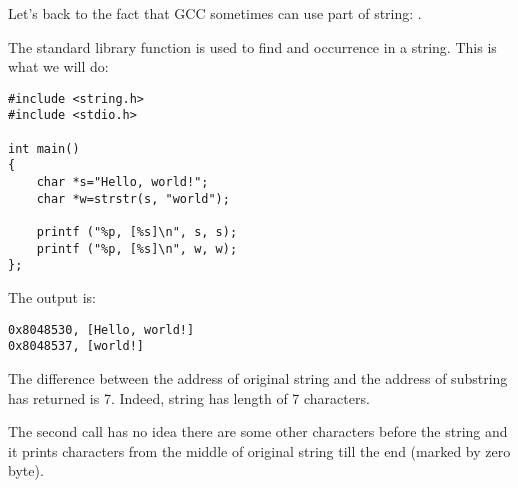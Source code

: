 \label{strstr_example}

Let's back to the fact that GCC sometimes can use part of string: .

The  \CCpp standard library function is used to find and occurrence in a string.
This is what we will do:

\begin{lstlisting}
#include <string.h>
#include <stdio.h>

int main()
{
	char *s="Hello, world!";
	char *w=strstr(s, "world");

	printf ("%p, [%s]\n", s, s);
	printf ("%p, [%s]\n", w, w);
};
\end{lstlisting}

The output is:

\begin{lstlisting}
0x8048530, [Hello, world!]
0x8048537, [world!]
\end{lstlisting}

The difference between the address of original string and the address of substring  has returned is 7.
Indeed,  string has length of 7 characters.

The second \printf call has no idea there are some other characters before the string and it prints characters
from the middle of original string till the end (marked by zero byte).


